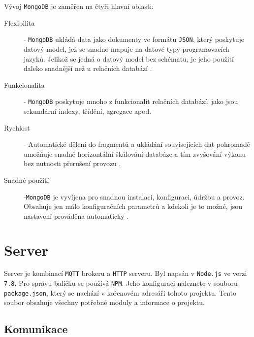 \documentclass[czech,BP]{thesiskiv}
\begin{document}
\newpage	
\noindent
Vývoj \texttt{MongoDB} je zaměřen na čtyři hlavní oblasti:
\begin{description}
\item [Flexibilita]
- \texttt{MongoDB} ukládá data jako dokumenty ve formátu \texttt{JSON}, který poskytuje datový model, jež se snadno mapuje na datové typy programovacích jazyků. Jelikož se jedná o datový model bez schématu, je jeho použití daleko snadnější než u relačních databází \cite{houvzvivcka2012aplikace}.

\item [Funkcionalita] - \texttt{MongoDB} poskytuje mnoho z funkcionalit relačních databází, jako jsou sekundární indexy, třídění, agregace apod. \cite{houvzvivcka2012aplikace}
\item [Rychlost] - Automatické dělení do fragmentů a ukládání souvisejících dat pohromadě umožňuje snadné horizontální škálování databáze a tím zvyšování výkonu bez nutnosti přerušení provozu \cite{houvzvivcka2012aplikace}.
\item [Snadné použití] -\texttt{MongoDB} je vyvíjena pro snadnou instalaci, konfiguraci, údržbu a provoz. Obsahuje jen málo konfiguračních parametrů a kdekoli je to možné, jsou nastavení prováděna automaticky \cite{houvzvivcka2012aplikace}.
\end{description}
	
	
	
	
	
	
	
	
	
	
	
	
	
	
	
	
	
	
	
	
	
	
	
\chapter{Server}
	
	Server je kombinací \texttt{MQTT} brokeru a \texttt{HTTP} serveru.
    Byl napsán v \texttt{Node.js} ve verzi \texttt{7.8}.
  Pro správu balíčku se používá \texttt{NPM}. Jeho konfiguraci naleznete v souboru \texttt{package.json}, který se nachází v kořenovém adresáři tohoto projektu. Tento soubor obsahuje všechny potřebné moduly a informace o projektu.
	

	\section{Komunikace}
\end{document}
